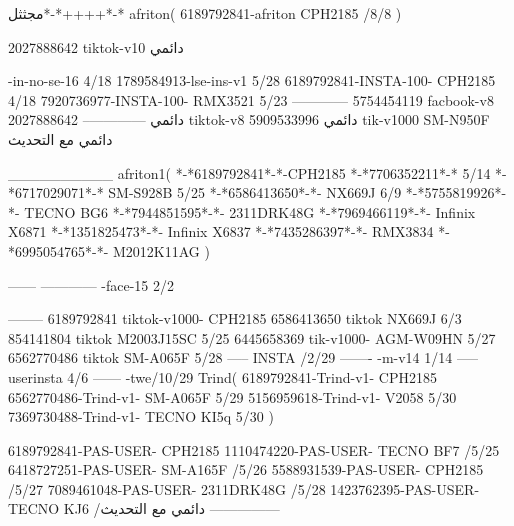 مجثثل*-*++++*-*
afriton(
6189792841-afriton CPH2185  /8/8
)

2027888642 tiktok-v10
دائمي

-in-no-se-16 4/18
1789584913-lse-ins-v1 5/28
6189792841-INSTA-100- CPH2185 4/18
7920736977-INSTA-100- RMX3521 5/23
------------
5754454119 facbook-v8
دائمي
--------------
2027888642 tiktok-v8
دائمي
5909533996 tik-v1000  SM-N950F
دائمي مع التحديث

__________
afriton1(
*-*6189792841*-*-CPH2185
*-*7706352211*-* 5/14
*-*6717029071*-*  SM-S928B 5/25
*-*6586413650*-*- NX669J  6/9
*-*5755819926*-*-   TECNO BG6  \5
*-*7944851595*-*-   2311DRK48G  \5
*-*7969466119*-*-   Infinix X6871  \5
*-*1351825473*-*-   Infinix X6837  \5
*-*7435286397*-*-   RMX3834  \5
*-*6995054765*-*-   M2012K11AG  \5
)


------
------------
-face-15 2/2

--------
6189792841 tiktok-v1000- CPH2185 
6586413650 tiktok NX669J  6/3
854141804 tiktok M2003J15SC   5/25
6445658369 tik-v1000- AGM-W09HN  5/27
6562770486 tiktok  SM-A065F   5/28
-----
 INSTA /2/29
-------
-m-v14 1/14
-----
userinsta 4/6
------
-twe/10/29
Trind(
6189792841-Trind-v1- CPH2185 
6562770486-Trind-v1- SM-A065F   5/29
5156959618-Trind-v1- V2058   5/30
7369730488-Trind-v1- TECNO KI5q   5/30
)


6189792841-PAS-USER- CPH2185 
1110474220-PAS-USER-  TECNO BF7  /5/25
6418727251-PAS-USER-  SM-A165F  /5/26
5588931539-PAS-USER-  CPH2185  /5/27
7089461048-PAS-USER-  2311DRK48G  /5/28
1423762395-PAS-USER- TECNO KJ6  /دائمي مع التحديث
    ---------------
